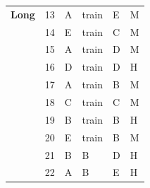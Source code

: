 \documentclass[pageno]{jpaper}
\begin{document}
\begin{table}[]
\begin{tabular}{@{}llllll@{}}
\textbf{Long}           & 13                                  & A                                          & train                                       & E                                           & M                                       \\
\textbf{}               & 14                                  & E                                          & train                                       & C                                           & M                                       \\
\textbf{}               & 15                                  & A                                          & train                                       & D                                           & M                                       \\
\textbf{}               & 16                                  & D                                          & train                                       & D                                           & H                                       \\
\textbf{}               & 17                                  & A                                          & train                                       & B                                           & M                                       \\
\textbf{}               & 18                                  & C                                          & train                                       & C                                           & M                                       \\
\textbf{}               & 19                                  & B                                          & train                                       & B                                           & H                                       \\
\textbf{}               & 20                                  & E                                          & train                                       & B                                           & M                                       \\
\textbf{}               & 21                                  & B                                          & B                                           & D                                           & H                                       \\
\textbf{}               & 22                                  & A                                          & B                                           & E                                           & H                                       \\

\end{tabular}
\end{table}
\end{document}

